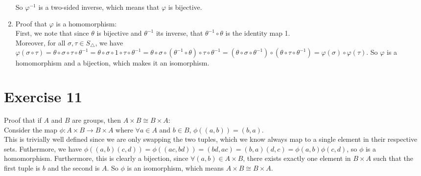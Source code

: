 \documentclass[12pt]{article}
\begin{document}
\begin{enumerate}[label=\textbf{\alph*.}]
            So $\varphi^{-1}$ is a two-sided inverse,
            which means that $\varphi$ is bijective.
        \item
            Proof that $\varphi$ is a homomorphism: \\
            First, we note that since $\theta$ is bijective
            and $\theta^{-1}$ its inverse,
            that $\theta^{-1} \circ \theta$ is the identity map 1. \\
            Moreover, for all $\sigma, \tau \in S_\triangle$,
            we have $\varphi(\sigma \circ \tau)
            = \theta \circ \sigma \circ \tau \circ \theta^{-1}
            = \theta \circ \sigma \circ 1 \circ \tau \circ \theta^{-1}
            = \theta \circ \sigma \circ (\theta^{-1} \circ \theta) \circ \tau
            \circ \theta^{-1}
            = (\theta \circ \sigma \circ \theta^{-1}) \circ (\theta \circ
            \tau \circ \theta^{-1})
            = \varphi(\sigma) \circ \varphi(\tau)$.
            So $\varphi$ is a homomorphism and a bijection,
            which makes it an isomorphism.
    \end{enumerate}


    \section*{Exercise 11}
    Proof that if $A$ and $B$ are groups,
    then $A \times B \cong B \times A$: \\
    Consider the map $\phi: A \times B \to B \times A$
    where $\forall a\in A$ and $b \in B$, $\phi((a, b)) = (b, a)$. \\
    This is trivially well defined since we are only swapping the two tuples,
    which we know always map to a single element in their respective sets.
    Futhermore, we have $\phi((a, b)(c, d)) = \phi((ac, bd))
    = (bd, ac) = (b, a)(d, c) = \phi(a, b)\phi(c, d)$,
    so $\phi$ is a homomorphism.
    Furthermore, this is clearly a bijection,
    since $\forall (a, b) \in A \times B$,
    there exists exactly one element in $B \times A$
    such that the first tuple is $b$ and the second is $A$.
    So $\phi$ is an isomorphism,
    which means  $A \times B \cong B \times A$.
\end{document}
